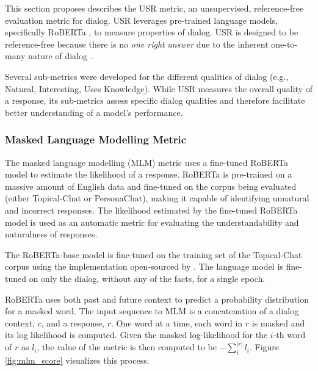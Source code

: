 \documentclass[11pt,a4paper]{article}
\begin{document}
This section proposes describes the USR metric, an unsupervised, reference-free evaluation metric for dialog. USR leverages pre-trained language models, specifically RoBERTa \citep{liu2019roberta}, to measure properties of dialog. USR is designed to be reference-free because there is no \textit{one right answer} due to the inherent one-to-many nature of dialog \citep{zhao2017learning}. 

Several sub-metrics were developed for the different qualities of dialog (e.g., Natural, Interesting, Uses Knowledge). While USR measures the overall quality of a response, its sub-metrics assess specific dialog qualities and therefore facilitate better understanding of a model's performance. 



\subsubsection{Masked Language Modelling Metric}
\label{mlm}

The masked language modelling (MLM) metric uses a fine-tuned RoBERTa \citep{liu2019roberta} model to estimate the likelihood of a response. RoBERTa is pre-trained on a massive amount of English data and fine-tuned on the corpus being evaluated (either Topical-Chat or PersonaChat), making it capable of identifying unnatural and incorrect responses. The likelihood estimated by the fine-tuned RoBERTa model is used as an automatic metric for evaluating the understandability and naturalness of responses.


The RoBERTa-base model \citep{liu2019roberta} is fine-tuned on the training set of the Topical-Chat corpus \citep{gopalakrishnan2019topical} using the implementation open-sourced by \citet{Wolf2019HuggingFacesTS}. The language model is fine-tuned on only the dialog, without any of the facts, for a single epoch.

RoBERTa uses both past and future context to predict a probability distribution for a masked word. The input sequence to MLM is a concatenation of a dialog context, $c$, and a response, $r$. One word at a time, each word in $r$ is masked and its log likelihood is computed. Given the masked log-likelihood for the $i$-th word of $r$ as $l_i$, the value of the metric is then computed to be $-\sum_{i}^{|r|} l_i$. Figure \ref{fig:mlm_score} visualizes this process.
\end{document}
